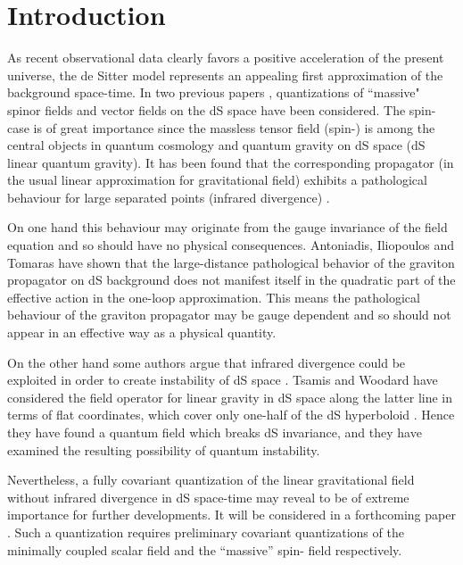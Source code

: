 \documentclass[a4paper,11pt,showpacs,preprintnumbers]{revtex4}
\begin{document}
\section{Introduction}

As recent observational data clearly favors a positive
acceleration of the present universe, the de Sitter model
represents an appealing first approximation of the background
space-time. In two previous papers \cite{gata,bagamota},
quantizations of  ``massive" spinor fields and  vector fields on
the dS space have been considered. The spin-\coordHE{} case is of great
importance since the massless tensor field (spin-\coordHE{}) is among the
central objects in quantum cosmology and quantum gravity on dS
space (dS linear quantum gravity). It has been found that the
corresponding propagator (in the usual linear approximation for
gravitational field)  exhibits a pathological behaviour for large
separated points (infrared divergence) \cite{altu, flilto,anmo1}.

On one hand this behaviour may originate from the gauge invariance
of the field equation and so should have no physical consequences.
Antoniadis, Iliopoulos and Tomaras \cite{anilto2} have shown that
the large-distance pathological behavior of the graviton
propagator on dS background does not manifest itself in the
quadratic part of the effective action in the one-loop
approximation. This means the pathological behaviour of the
graviton propagator may be gauge dependent and so should not
appear in an effective way as a physical quantity.

On the other hand some authors argue that infrared divergence
could be exploited in order to create instability of dS space
\cite{for, anilto1}. Tsamis and Woodard have considered the field
operator for linear gravity in dS space along the latter line in
terms of flat coordinates, which cover only one-half of the dS
hyperboloid \cite{tswo}. Hence they have found a quantum field
which breaks dS invariance, and  they have examined the resulting
possibility of quantum instability.

Nevertheless, a fully covariant quantization of the linear
gravitational field without infrared divergence in dS space-time
may reveal to be of extreme importance for further developments.
It will be considered in a forthcoming paper \cite{gareta2}. Such
a quantization requires preliminary covariant quantizations of the
minimally coupled scalar field and the ``massive'' spin-\coordHE{} field
respectively.
\end{document}
